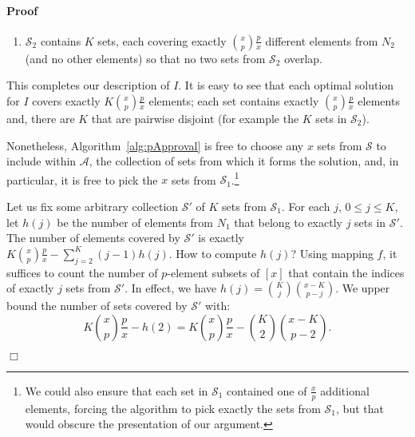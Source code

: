 \documentclass[11pt]{article}
\newenvironment{proof}{\paragraph{Proof}}{\hfill$\Box$\medskip}
\newcommand{\calA}{{{\mathcal{A}}}}
\newcommand{\calS}{{{\mathcal{S}}}}
\begin{document}
\begin{proof}
\begin{enumerate}
\item $\calS_2$ contains $K$ sets, each covering exactly ${x \choose
      p} \frac{p}{x}$ different elements from $N_2$ (and no other
    elements) so that no two sets from $\calS_2$ overlap.
\end{enumerate}
This completes our description of $I$. It is easy to see that each
  optimal solution for $I$ covers exactly $K{x \choose p}\frac{p}{x}$
  elements; each set contains exactly ${x \choose p}\frac{p}{x}$
  elements and, there are $K$ that are pairwise disjoint (for example
  the $K$ sets in $\calS_2$).

  Nonetheless, Algorithm~\ref{alg:pApproval} is free to choose any $x$
  sets from $\calS$ to include within $\calA$, the collection of sets
  from which it forms the solution, and, in particular, it is free to
  pick the $x$ sets from $\calS_1$.\footnote{We could also ensure that
    each set in $\calS_1$ contained one of $\frac{x}{p}$ additional
    elements, forcing the algorithm to pick exactly the sets from
    $\calS_1$, but that would obscure the presentation of our
    argument.} 

  Let us fix some arbitrary collection $\calS'$ of $K$ sets from
  $\calS_1$. For each $j$, $0 \leq j \leq K$, let $h(j)$ be the number
  of elements from $N_1$ that belong to exactly $j$ sets in $\calS'$.
  The number of elements covered by $\calS'$ is exactly $K{x \choose
    p}\frac{p}{x} - \sum_{j=2}^K(j-1)h(j)$.  How to compute $h(j)$?
  Using mapping $f$, it suffices to count the number of $p$-element
  subsets of $[x]$ that contain the indices of exactly $j$ sets from
  $\calS'$. In effect, we have $h(j) = {K \choose j}{{x - K} \choose
    p-j}$. We upper bound the number of sets covered by $\calS'$ with:
  \[ 
  K{x \choose p}\frac{p}{x} - h(2) = K{x \choose p} \frac{p}{x} - {K \choose 2}{x-K \choose p-2}.
  \]




\end{proof}
\end{document}
